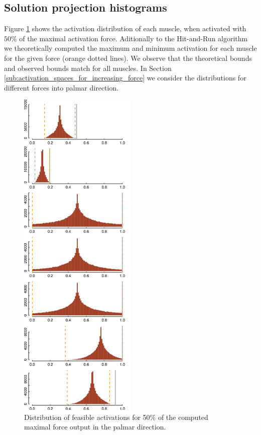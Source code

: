 \subsection{Solution projection histograms}
Figure \ref{fig:raw_histograms} shows the activation distribution of each muscle, when activated with $50\%$ of the maximal activation force. Aditionally to the Hit-and-Run algorithm we theoretically computed the maximum and minimum activation for each muscle for the given force (orange dotted lines). We observe that the theoretical bounds and observed bounds match for all muscles. %
In Section \ref{sub:activation_spaces_for_increasing_force} we consider the distributions for different forces into palmar direction.
\begin{figure}[!htbp]
\centering
\includegraphics[width=0.5\textwidth]{sections/figs/raw_histograms.png}
\caption{Distribution of feasible activations for 50\% of the computed maximal force output in the palmar direction.}
\label{fig:raw_histograms}
\end{figure}

